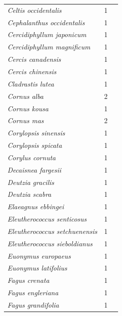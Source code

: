 \documentclass[11pt]{article}
\begin{document}
\begin{longtable}{p{}p{}p{}}
  \emph{Celtis occidentalis} &   1 & \emph{\citep{zohner2016}} \\ 
  \emph{Cephalanthus occidentalis} &   1 & \emph{\citep{zohner2016}} \\ 
  \emph{Cercidiphyllum japonicum} &   1 & \emph{\citep{zohner2016}} \\ 
  \emph{Cercidiphyllum magnificum} &   1 & \emph{\citep{zohner2016}} \\ 
  \emph{Cercis canadensis} &   1 & \emph{\citep{zohner2016}} \\ 
  \emph{Cercis chinensis} &   1 & \emph{\citep{zohner2016}} \\ 
  \emph{Cladrastis lutea} &   1 & \emph{\citep{zohner2016}} \\ 
  \emph{Cornus alba} &   2 & \emph{\citep{Laube:2014a,zohner2016}} \\ 
  \emph{Cornus kousa} &   1 & \emph{\citep{zohner2016}} \\ 
  \emph{Cornus mas} &   2 & \emph{\citep{Laube:2014a,Laube:2014b}} \\ 
  \emph{Corylopsis sinensis} &   1 & \emph{\citep{zohner2016}} \\ 
  \emph{Corylopsis spicata} &   1 & \emph{\citep{zohner2016}} \\ 
  \emph{Corylus cornuta} &   1 & \emph{\citep{flynn2018}} \\ 
  \emph{Decaisnea fargesii} &   1 & \emph{\citep{zohner2016}} \\ 
  \emph{Deutzia gracilis} &   1 & \emph{\citep{zohner2016}} \\ 
  \emph{Deutzia scabra} &   1 & \emph{\citep{zohner2016}} \\ 
  \emph{Elaeagnus ebbingei} &   1 & \emph{\citep{zohner2016}} \\ 
  \emph{Eleutherococcus senticosus} &   1 & \emph{\citep{zohner2016}} \\ 
  \emph{Eleutherococcus setchuenensis} &   1 & \emph{\citep{zohner2016}} \\ 
  \emph{Eleutherococcus sieboldianus} &   1 & \emph{\citep{zohner2016}} \\ 
  \emph{Euonymus europaeus} &   1 & \emph{\citep{zohner2016}} \\ 
  \emph{Euonymus latifolius} &   1 & \emph{\citep{zohner2016}} \\ 
  \emph{Fagus crenata} &   1 & \emph{\citep{zohner2016}} \\ 
  \emph{Fagus engleriana} &   1 & \emph{\citep{zohner2016}} \\ 
  \emph{Fagus grandifolia} &   1 & \emph{\citep{flynn2018}} \\ 

\end{longtable}
\end{document}

